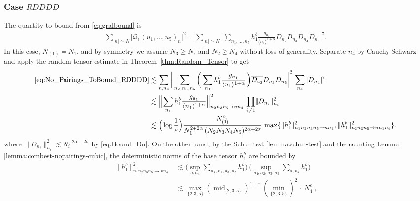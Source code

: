 \documentclass[11pt, xcolor = dvipsnames,reqno
]{amsart}
\theoremstyle{definition}
\theoremstyle{remark}
\begin{document}
\subsubsection{Case $RDDDD$}\label{subsec:rdddd-nopairing}
The quantity to bound from \eqref{eq:gralbound} is 
\begin{align}\label{eq:No_Pairings_ToBound_RDDDD}
    \sum_{|n| \simeq N}  \big| \mathcal{Q}_1(u_1, \ldots, u_5)_n \big|^2
    = 
    \sum_{|n|\simeq N} \bigg| \sum_{n_1, \ldots, n_5 } h^b_1 \frac{g_{n_1}}{\langle n_1 \rangle^{1+\alpha}} \overline{D_{n_2}} D_{n_3} \overline{D_{n_4}} D_{n_5} \bigg|^2.
\end{align}
In this case, $N_{(1)} = N_1$, and by symmetry we assume $N_3 \geq N_5$ and $N_2 \geq N_4$ without loss of generality. 
Separate $n_4$ by Cauchy-Schwarz and apply the random tensor estimate in Theorem~\ref{thm:Random_Tensor} to get
\begin{align}\label{eq:No_Pairings_ToBound_RDDDD_2}
    \eqref{eq:No_Pairings_ToBound_RDDDD}
    &\lesssim 
    \sum_{n, n_4} \bigg| \sum_{n_2,n_3,n_5}  \bigg( \sum_{n_1} h^b_1 \frac{g_{n_1}}{\langle n_1 \rangle^{1+\alpha}} \bigg) \overline{D_{n_2}} D_{n_3} D_{n_5}  \bigg|^2
    \, \sum_{n_4} |D_{n_4}|^2 \nonumber \\
    & \lesssim 
    \Big\lVert  \sum_{n_1} h^b_1 \frac{g_{n_1}}{\langle n_1 \rangle^{1+\alpha}}  \Big\rVert_{n_2n_3n_5 \to nn_4}^2 \, 
    \prod_{i \neq 1} \lVert D_{n_i} \rVert_{n_i}^2 \nonumber \\
    & \lesssim \Big( \log \frac{1}{\varepsilon} \Big)
    \frac{N_{(1)}^{\varepsilon_1}}{N_1^{2+2\alpha} \, (N_2N_3N_4N_5)^{2\alpha + 2\sigma}} \, \max\{  \lVert  h^b_1 \rVert_{n_1n_2n_3n_5 \to nn_4}^2, \lVert  h^b_1 \rVert_{n_2n_3n_5 \to nn_1n_4}^2  \}. 
\end{align}
where $\lVert D_{n_i} \rVert_{n_i}^2 \lesssim N_i^{-2\alpha - 2\sigma}$ by \eqref{eq:Bound_Dn}. 
On the other hand, 
by the Schur test \ref{lemma:schur-test} and the counting Lemma \ref{lemma:combest-nopairings-cubic}, the deterministic norms of the base tensor $h_1^b$ are bounded by
\begin{align}\label{eq:Counting_RDDDD_4}
    \lVert  h^b_1 \rVert_{n_1n_2n_3n_5 \to nn_4}^2
    & \lesssim \Big(\sup_{n, n_4} \sum_{n_1, n_2, n_3, n_5} h^b_1  \Big)
    \, \Big( \sup_{n_1, n_2, n_3, n_5} \sum_{n, n_4} h^b _1\Big) \nonumber \\
    &\lesssim \operatorname{max}_{\{2,3,5\}} (\operatorname{mid}_{\{2,3,5\}})^{1+{\varepsilon_1}} (\operatorname{min}_{\{2,3,5\}})^2 \, \cdot \, N_4^{\varepsilon_1}, 
\end{align}
\end{document}
